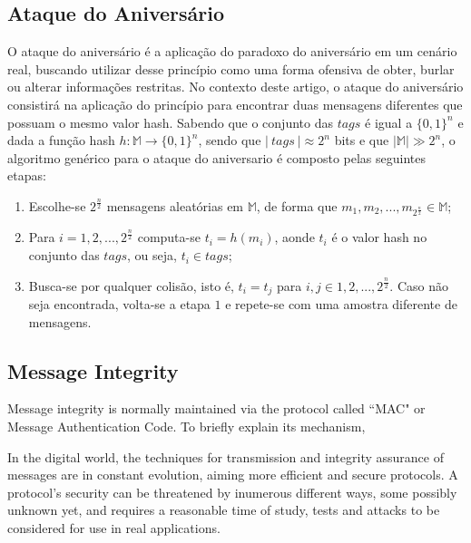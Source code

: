 \documentclass[12pt]{article}
\begin{document}
\subsection{Ataque do Aniversário}

O ataque do aniversário é a aplicação do paradoxo do aniversário em um cenário real, buscando utilizar desse princípio
como uma forma ofensiva de obter, burlar ou alterar informações restritas. No contexto deste artigo, o ataque do aniversário
consistirá na aplicação do princípio para encontrar duas mensagens diferentes que possuam o mesmo valor hash. Sabendo que
o conjunto das \(tags\) é igual a \(\{0,1\}^n\) e dada a função hash \(h : \mathbb{M} \to \{0,1\}^n\), sendo que \(|\ tags\ | 
\approx 2^n\) bits e que \(| \mathbb{M} | \gg 2^n\), o algoritmo genérico para o ataque do aniversario é composto pelas seguintes 
etapas:
\begin{enumerate}
\item Escolhe-se \(2^\frac{n}{2}\) mensagens aleatórias em \(\mathbb{M}\), de forma que \(m_1, m_2, ... , m_{2^\frac{n}{2}}
\in \mathbb{M}\);
\item Para \(i = 1,2, ... , 2^\frac{n}{2}\) computa-se \(t_i = h(m_i)\), aonde \(t_i\) é o valor hash no conjunto das \(tags\),
ou seja, \(t_i \in tags\); 
\item Busca-se por qualquer colisão, isto é, \(t_i = t_j\) para \(i, j \in {1, 2, ... , 2^\frac{n}{2}}\). Caso não seja 
encontrada, volta-se a etapa \(1\) e repete-se com uma amostra diferente de mensagens.
\end{enumerate}

\iffalse
\subsection{Se pa - Distributed System}
A distributed system is a collection of independent computers that appears to its users as a single 
coherent system \cite{tanenbaum2002distributed}.
\fi

\iffalse
\subsection{Message Integrity}

Message integrity is normally maintained via the protocol called “MAC" or Message Authentication Code. 
To briefly explain its mechanism,

In the digital world, the techniques for transmission and integrity assurance of messages are in constant
evolution, aiming more efficient and secure protocols. A protocol's security can be threatened by inumerous
different ways, some possibly unknown yet, and requires a reasonable time of study, tests and attacks
to be considered for use in real applications.
\end{document}
